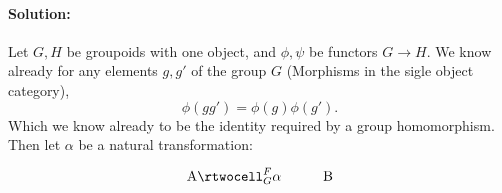 \documentclass{article}
\begin{document}
\begin{enumerate}
        \paragraph{Solution: }Let $G,H$ be groupoids with one object, and $\phi,\psi$ be functors $G\to H$. We know already for any elements $g,g'$ of the group $G$ (Morphisms in the sigle object category),
        \[
        \phi(gg')=\phi(g)\phi(g')
        .\] 
        Which we know already to be the identity required by a group homomorphism. Then let $\alpha$ be a natural transformation:
        \[ \xymatrix{
        \mathrm{A} \rtwocell^F_G{\alpha} &\mathrm{B}
        }\] 
\end{enumerate}
\end{document}
